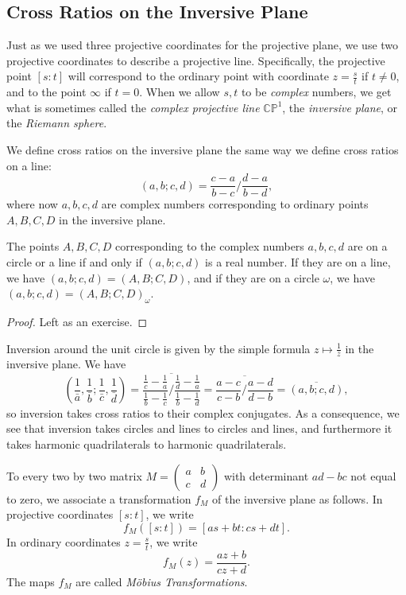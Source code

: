 \subsection{Cross Ratios on the Inversive Plane}

Just as we used three projective coordinates for the projective plane, we use two projective coordinates to describe a projective line. Specifically, the projective point $[s:t]$ will correspond to the ordinary point with coordinate $z = \frac{s}{t}$ if $t\ne 0$, and to the point $\infty$ if $t=0$. When we allow $s,t$ to be \emph{complex} numbers, we get what is sometimes called the \emph{complex projective line} $\mathbb{CP}^1$, the \emph{inversive plane}, or the \emph{Riemann sphere}.

We define cross ratios on the inversive plane the same way we define cross ratios on a line:
\[
(a,b;c,d) = \frac{c-a}{b-c}\bigg/\frac{d-a}{b-d},
\]
where now $a,b,c,d$ are complex numbers corresponding to ordinary points $A,B,C,D$ in the inversive plane.

\begin{prop} The points $A,B,C,D$ corresponding to the complex numbers $a,b,c,d$ are on a circle or a line if and only if $(a,b;c,d)$ is a real number. If they are on a line, we have $(a,b;c,d) = (A,B;C,D)$, and if they are on a circle $\omega$, we have $(a,b;c,d) = (A,B;C,D)_{\omega}$.
\end{prop}
\begin{proof} Left as an exercise.
\end{proof}

Inversion around the unit circle is given by the simple formula $z\mapsto \frac{1}{\bar{z}}$ in the inversive plane. We have
\[
\left(\frac{1}{\bar{a}},\frac{1}{\bar{b}};\frac{1}{\bar{c}},\frac{1}{\bar{d}}\right) = \overline{\frac{\frac{1}{c}-\frac{1}{a}}{\frac{1}{b}-\frac{1}{c}}\bigg/\frac{\frac{1}{d}-\frac{1}{a}}{\frac{1}{b}-\frac{1}{d}}} = \overline{\frac{a-c}{c-b}\bigg/\frac{a-d}{d-b}} = \overline{(a,b;c,d)},
\]
so inversion takes cross ratios to their complex conjugates. As a consequence, we see that inversion takes circles and lines to circles and lines, and furthermore it takes harmonic quadrilaterals to harmonic quadrilaterals.

\begin{defn} To every two by two matrix $M=\left(\begin{array}{cc}a & b\\ c & d\end{array}\right)$ with determinant $ad-bc$ not equal to zero, we associate a transformation $f_M$ of the inversive plane as follows. In projective coordinates $[s:t]$, we write
\[
f_M([s:t]) = [as+bt:cs+dt].
\]
In ordinary coordinates $z = \frac{s}{t}$, we write
\[
f_M(z) = \frac{az+b}{cz+d}.
\]
The maps $f_M$ are called \emph{M\"obius Transformations}.
\end{defn}

